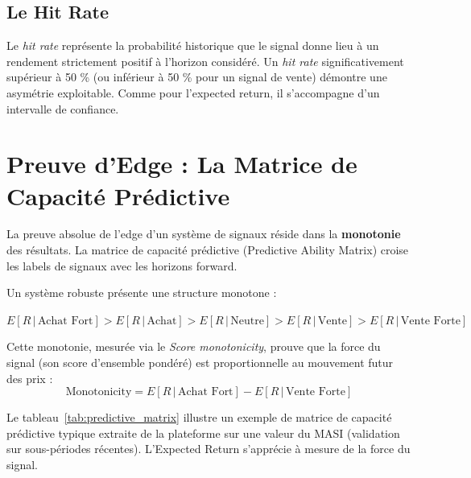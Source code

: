 \subsection{Le Hit Rate}
Le \textit{hit rate} représente la probabilité historique que le signal donne lieu à
un rendement strictement positif à l'horizon considéré. Un \textit{hit rate}
significativement supérieur à 50 \% (ou inférieur à 50 \% pour un signal de vente)
démontre une asymétrie exploitable. Comme pour l'expected return, il s'accompagne
d'un intervalle de confiance.

\section{Preuve d'Edge : La Matrice de Capacité Prédictive}

La preuve absolue de l'edge d'un système de signaux réside dans la \textbf{monotonie}
des résultats. La matrice de capacité prédictive (Predictive Ability Matrix) croise les
labels de signaux avec les horizons forward.

Un système robuste présente une structure monotone :
\begin{center}
$E[R \,|\, \text{Achat Fort}] > E[R \,|\, \text{Achat}] > E[R \,|\, \text{Neutre}] > E[R \,|\, \text{Vente}] > E[R \,|\, \text{Vente Forte}]$
\end{center}

Cette monotonie, mesurée via le \textit{Score monotonicity},
prouve que la force du signal (son score d'ensemble pondéré) est proportionnelle
au mouvement futur des prix :
\begin{equation}
\text{Monotonicity} = E[R \,|\, \text{Achat Fort}] - E[R \,|\, \text{Vente Forte}]
\end{equation}

Le tableau~\ref{tab:predictive_matrix} illustre un exemple de matrice
de capacité prédictive typique extraite de la plateforme sur une valeur du MASI
(validation sur sous-périodes récentes). L'Expected Return s'apprécie à mesure de la force
du signal.

